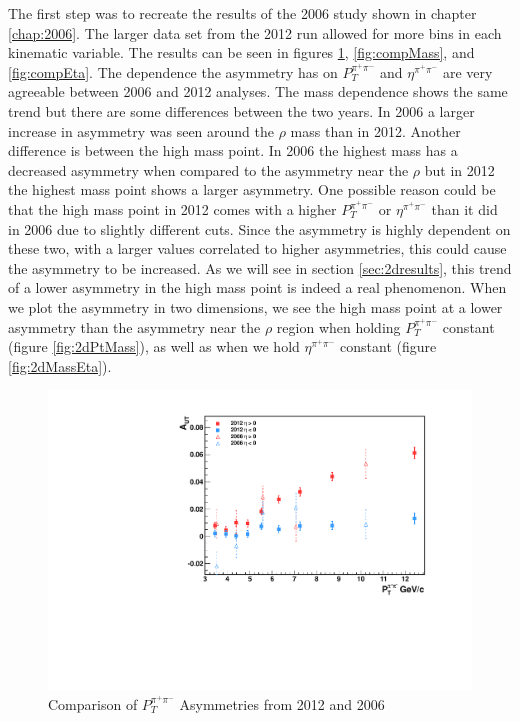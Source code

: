 \documentclass[abstract = on,listof=totoc, bibliography=totoc]{scrreprt}
\newcommand{\ptpair}{P_{T}^{\pi^+\pi^-}}
\newcommand{\etapair}{\eta^{\pi^+\pi^-}}
\begin{document}
The first step was to recreate the results of the 2006 study shown in chapter \ref{chap:2006}. The larger data set from the 2012 run allowed for more bins in each kinematic variable. The results can be seen in figures  \ref{fig:compPt}, \ref{fig:compMass}, and \ref{fig:compEta}. The dependence the asymmetry has on $\ptpair$ and $\etapair$ are very agreeable between 2006 and 2012 analyses. The mass dependence shows the same trend but there are some differences between the two years. In 2006 a larger increase in asymmetry was seen around the $\rho$ mass than in 2012. Another difference is between the high mass point. In 2006 the highest mass has a decreased asymmetry when compared to the asymmetry near the $\rho$ but in 2012 the highest mass point shows a larger asymmetry. One possible reason could be that the high mass point in 2012 comes with a higher $\ptpair$ or $\etapair$ than it did in 2006 due to slightly different cuts. Since the asymmetry is highly dependent on these two, with a larger values correlated to higher asymmetries, this could cause the asymmetry to be increased. As we will see in section \ref{sec:2dresults}, this trend of a lower asymmetry in the high mass point is indeed a real phenomenon. When we plot the asymmetry in two dimensions, we see the high mass point at a lower asymmetry than the asymmetry near the $\rho$ region when holding $\ptpair$ constant (figure \ref{fig:2dPtMass}), as well as when we hold $\etapair$ constant (figure \ref{fig:2dMassEta}).    


\begin{figure}
\begin{center}
\includegraphics[width = .7\textwidth]{asymsHiLoAnselm_Pt_8_24_15}
\caption[$\ptpair$ Asymmetries 2012 and 2006]{Comparison of $\ptpair$ Asymmetries from 2012 and 2006}
\label{fig:compPt}
\end{center}
\end{figure}
\end{document}
